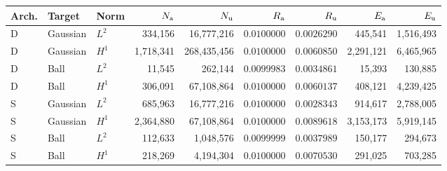 \begin{tabular}{@{}lllrrrrrr@{}}
\toprule
Arch. & Target & Norm & $N_{\rm a}$ & $N_{\rm u}$ & $R_{\rm a}$ & $R_{\rm u}$ & $E_{\rm a}$ & $E_{\rm u}$ \\
\midrule
D & Gaussian & $L^2$ & 334,156 & 16,777,216 & $0.0100000$ & $0.0026290$ & 445,541 & 1,516,493 \\
D & Gaussian & $H^1$ & 1,718,341 & 268,435,456 & $0.0100000$ & $0.0060850$ & 2,291,121 & 6,465,965 \\
D & Ball & $L^2$ & 11,545 & 262,144 & $0.0099983$ & $0.0034861$ & 15,393 & 130,885 \\
D & Ball & $H^1$ & 306,091 & 67,108,864 & $0.0100000$ & $0.0060137$ & 408,121 & 4,239,425 \\
S & Gaussian & $L^2$ & 685,963 & 16,777,216 & $0.0100000$ & $0.0028343$ & 914,617 & 2,788,005 \\
S & Gaussian & $H^1$ & 2,364,880 & 67,108,864 & $0.0100000$ & $0.0089618$ & 3,153,173 & 5,919,145 \\
S & Ball & $L^2$ & 112,633 & 1,048,576 & $0.0099999$ & $0.0037989$ & 150,177 & 294,673 \\
S & Ball & $H^1$ & 218,269 & 4,194,304 & $0.0100000$ & $0.0070530$ & 291,025 & 703,285 \\
\bottomrule
\end{tabular}

